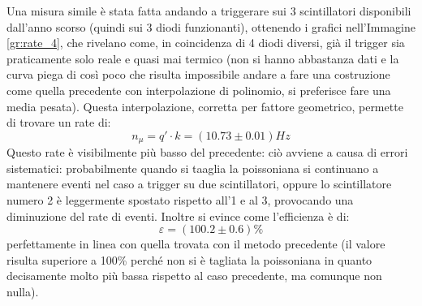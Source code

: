 Una misura simile è stata fatta andando a triggerare sui 3 scintillatori disponibili dall'anno scorso (quindi sui 3 diodi funzionanti), ottenendo i grafici nell'Immagine \ref{gr:rate_4}, che rivelano come, in coincidenza di 4 diodi diversi, già il trigger sia praticamente solo reale e quasi mai termico (non si hanno abbastanza dati e la curva piega di così poco che risulta impossibile andare a fare una costruzione come quella precedente con interpolazione di polinomio, si preferisce fare una media pesata). Questa interpolazione, corretta per fattore geometrico, permette di trovare un rate di:
\begin{equation}
  n_\mu = q' \cdot k = (10.73 \pm 0.01) Hz
\end{equation}
Questo rate è visibilmente più basso del precedente: ciò avviene a causa di errori sistematici: probabilmente quando si taaglia la poissoniana si continuano a mantenere eventi nel caso a trigger su due scintillatori, oppure lo scintillatore numero 2 è leggermente spostato rispetto all'1 e al 3, provocando una diminuzione del rate di eventi.
Inoltre si evince come l'efficienza è di:
\begin{equation}
  \varepsilon = (100.2 \pm 0.6)\%
\end{equation}
perfettamente in linea con quella trovata con il metodo precedente (il valore risulta superiore a 100\% perché non si è tagliata la poissoniana in quanto decisamente molto più bassa rispetto al caso precedente, ma comunque non nulla).


